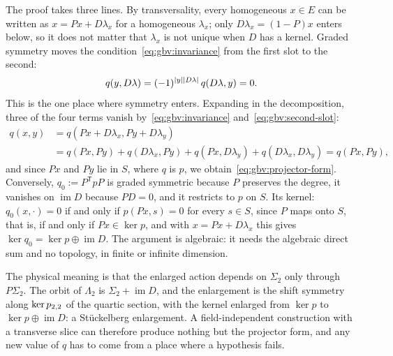 The proof takes three lines.
By transversality, every homogeneous $x \in E$ can be written as $x = P x + D \lambda_x$ for a homogeneous $\lambda_x$; only $D \lambda_x = (1 - P) x$ enters below, so it does not matter that $\lambda_x$ is not unique when $D$ has a kernel.
Graded symmetry moves the condition~\eqref{eq:gbv:invariance} from the first slot to the second:
\begin{equation}
  \label{eq:gbv:second-slot}
  q(y, D \lambda)
    = (-1)^{{|y|} {|D \lambda|}} \, q(D \lambda, y)
    = 0.
\end{equation}
This is the one place where symmetry enters.
Expanding in the decomposition, three of the four terms vanish by~\eqref{eq:gbv:invariance} and~\eqref{eq:gbv:second-slot}:
\begin{equation}
  \label{eq:gbv:expansion}
  \begin{aligned}
    q(x, y)
      &
      = q(P x + D \lambda_x, P y + D \lambda_y)
    \\
      &
      = q(P x, P y)
        + q(D \lambda_x, P y)
        + q(P x, D \lambda_y)
        + q(D \lambda_x, D \lambda_y)
      = q(P x, P y),
  \end{aligned}
\end{equation}
and since $P x$ and $P y$ lie in $S$, where $q$ is $p$, we obtain~\eqref{eq:gbv:projector-form}.
Conversely, $q_0 := P^{\mathsf T} p P$ is graded symmetric because $P$ preserves the degree, it vanishes on $\operatorname{im} D$ because $P D = 0$, and it restricts to $p$ on $S$.
Its kernel: $q_0(x, \cdot) = 0$ if and only if $p(P x, s) = 0$ for every $s \in S$, since $P$ maps onto $S$, that is, if and only if $P x \in \ker p$, and with $x = P x + D \lambda_x$ this gives $\ker q_0 = \ker p \oplus \operatorname{im} D$.
The argument is algebraic: it needs the algebraic direct sum and no topology, in finite or infinite dimension.

The physical meaning is that the enlarged action depends on $\Sigma_2$ only through $P \Sigma_2$.
The orbit of $\Lambda_2$ is $\Sigma_2 + \operatorname{im} D$, and the enlargement is the shift symmetry along $\ker p_{2,2}$ of the quartic section, with the kernel enlarged from $\ker p$ to $\ker p \oplus \operatorname{im} D$: a Stückelberg enlargement.
A field-independent construction with a transverse slice can therefore produce nothing but the projector form, and any new value of $q$ has to come from a place where a hypothesis fails.

